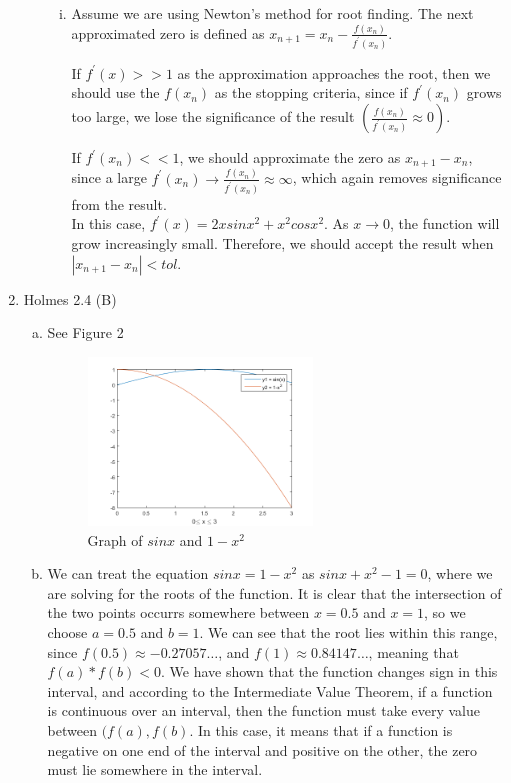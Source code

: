 \documentclass[11pt]{article}
\begin{document}
\begin{enumerate}
\begin{enumerate}[(a)]
\begin{enumerate}[i.]
		\item Assume we are using Newton's method for root finding. The next approximated zero is defined as $x_{n+1} =
			x_n - \frac{f(x_n)}{f^{'}(x_n)}$.

			If $f^{'}(x) >> 1$ as the approximation approaches the root, then we should
			use the $f(x_n)$ as the stopping criteria, since if $f^{'}(x_n)$ grows too large, we lose the significance of the
			result $(\frac{f(x_n)}{f^{'}(x_n)} \approx 0)$.

			If $f^{'}(x_n) << 1$, we should approximate the zero as $x_{n+1}-
			x_n$, since a large $f^{'}(x_n) \to \frac{f(x_n)}{f^{'}(x_n)} \approx \infty$, which again removes significance
			from the result. \\

			In this case, $f^{'}(x) = 2xsinx^2 + x^2cosx^2$. As $x\to0$, the function will grow increasingly small. Therefore,
			we should accept the result when $|x_{n+1} - x_n| < tol$. \\
		\end{enumerate}

	\end{enumerate}

\item Holmes 2.4 (B)

	\begin{enumerate}[(a)]

		\item See Figure 2
			\begin{figure}[H]
			\centering
			\includegraphics[width=0.6\textwidth]{q2_graph.png}
			\caption{Graph of $sinx$ and $1-x^2$}
		\end{figure}

		\item We can treat the equation $sinx = 1-x^2$ as $sinx + x^2 - 1 = 0$, where we are solving for the roots of the function.
		It is clear that the intersection of the two points occurrs somewhere between $x=0.5$ and $x=1$, so we choose $a = 0.5$ and
		$b=1$. We can see that the root lies within this range, since $f(0.5) \approx -0.27057\dots$, and $f(1) \approx 0.84147\dots$,
		meaning that $f(a) * f(b) < 0$. We have shown that the function changes sign in this interval, and according to the
		Intermediate Value Theorem, if a function is continuous over an interval, then the function must take every value between
		$(f(a), f(b)$. In this case, it means that if a function is negative on one end of the interval and positive on the other,
		the zero must lie somewhere in the interval.\\


\end{enumerate}
\end{enumerate}
\end{document}
